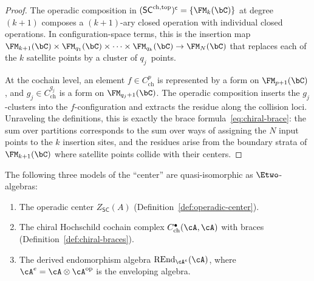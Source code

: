 \begin{proof}
The operadic composition in
$(\mathsf{SC}^{\mathrm{ch,top}})^{\mathsf{c}} = \{\FM_k(\bC)\}$
at degree~$(k+1)$ composes a $(k+1)$-ary closed operation with
individual closed operations. In configuration-space terms, this
is the insertion map
$\FM_{k+1}(\bC) \times \FM_{q_1}(\bC) \times \cdots \times
\FM_{q_k}(\bC) \to \FM_N(\bC)$
that replaces each of the $k$ satellite points by a cluster of
$q_j$~points.

At the cochain level, an element $f \in C^p_{\mathrm{ch}}$ is
represented by a form on $\FM_{p+1}(\bC)$, and
$g_j \in C^{q_j}_{\mathrm{ch}}$ is a form on $\FM_{q_j+1}(\bC)$.
The operadic composition inserts the $g_j$-clusters into the
$f$-configuration and extracts the residue along the collision
loci. Unraveling the definitions, this is exactly the brace
formula~\eqref{eq:chiral-brace}: the sum over partitions
corresponds to the sum over ways of assigning the $N$ input
points to the $k$ insertion sites, and the residues arise from the
boundary strata of $\FM_{k+1}(\bC)$ where satellite points collide
with their centers.
\end{proof}

\begin{theorem}[Comparison theorem: operadic center $=$ brace center;
\ClaimStatusProvedHere]
\label{thm:operadic-brace-comparison}
The following three models of the ``center'' are quasi-isomorphic as
$\Etwo$-algebras:
\begin{enumerate}[label=\textup{(\roman*)}]
\item The operadic center $Z_{\mathsf{SC}}(A)$
 \textup{(}Definition~\textup{\ref{def:operadic-center})}.
\item The chiral Hochschild cochain complex
 $C^{\bullet}_{\mathrm{ch}}(\cA, \cA)$ with braces
 \textup{(}Definition~\textup{\ref{def:chiral-braces})}.
\item The derived endomorphism algebra
 $\operatorname{REnd}_{\cA^e}(\cA)$, where
 $\cA^e = \cA \otimes \cA^{\mathrm{op}}$ is the enveloping
 algebra.
\end{enumerate}
\end{theorem}

